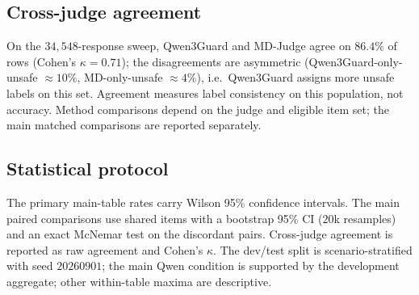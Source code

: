 \documentclass{article}
\begin{document}
\subsection{Cross-judge agreement}
\label{app:crossjudge}
On the $34{,}548$-response sweep, Qwen3Guard and MD-Judge agree on $86.4\%$ of rows
(Cohen's $\kappa=0.71$); the disagreements are asymmetric (Qwen3Guard-only-unsafe
$\approx 10\%$, MD-only-unsafe $\approx 4\%$), i.e.\ Qwen3Guard assigns more unsafe labels on this set. Agreement measures label consistency on this population, not accuracy.
Method comparisons depend on the judge and eligible item set; the main matched
comparisons are reported separately.

\subsection{Statistical protocol}
\label{app:stats}
The primary main-table rates carry Wilson 95\% confidence intervals. The
main paired comparisons use shared items with a bootstrap 95\% CI
($20$k resamples) and an exact McNemar test on the discordant pairs. Cross-judge
agreement is reported as raw agreement and Cohen's $\kappa$. The dev/test split is
scenario-stratified with seed $20260901$; the main Qwen condition is supported by the development aggregate; other within-table maxima are descriptive.
\end{document}
